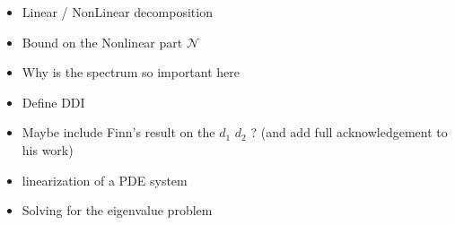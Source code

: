 \begin{itemize}
    \item Linear / NonLinear decomposition
    \item Bound on the Nonlinear part $\mathcal N$
    
    \item Why is the spectrum so important here
    \item Define DDI
    \item Maybe include Finn's result on the $d_1$ $d_2$ ? (and add full acknowledgement to his work)
    \item linearization of a PDE system
    \item Solving for the eigenvalue problem   
\end{itemize}